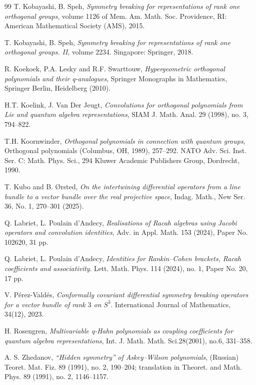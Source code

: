 \documentclass[a4paper,12pt]{article}
\numberwithin{equation}{section}
\theoremstyle{rem}
\theoremstyle{definition}
\begin{document}
\begin{thebibliography}{99}
 T. Kobayashi, B. Speh, \emph{Symmetry breaking for representations of rank one orthogonal groups}, volume 1126 of Mem. Am. Math. Soc. Providence, RI: American Mathematical Society (AMS), 2015.

 T. Kobayashi, B. Speh,\emph{ Symmetry breaking for representations of rank one orthogonal groups. II},
volume 2234. Singapore: Springer, 2018.

 R. Koekoek, P.A. Lesky and R.F. Swarttouw, \emph{Hypergeometric orthogonal polynomials and
their q-analogues}, Springer Monographs in Mathematics, Springer Berlin, Heidelberg (2010).

 H.T. Koelink, J. Van Der Jeugt, \emph{Convolutions for orthogonal polynomials from Lie and quantum algebra representations}, SIAM J. Math. Anal. 29 (1998), no. 3, 794--822.

 T.H. Koornwinder, \emph{Orthogonal polynomials in connection with quantum groups}, Orthogonal polynomials (Columbus, OH, 1989), 257--292. NATO Adv. Sci. Inst. Ser. C: Math. Phys. Sci., 294 Kluwer Academic Publishers Group, Dordrecht, 1990.

 T. Kubo and B. Ørsted, \emph{On the intertwining differential operators from a line bundle to a vector bundle over the real projective space}, Indag. Math., New Ser. 36, No. 1, 270--301 (2025). 


 Q. Labriet, L. Poulain d'Andecy, \emph{Realisations of Racah algebras using Jacobi operators and convolution identities}, Adv. in Appl. Math. 153 (2024), Paper No. 102620, 31 pp.

 Q. Labriet, L. Poulain d'Andecy, \emph{Identities for Rankin--Cohen brackets, Racah coefficients and associativity}. Lett. Math. Phys. 114 (2024), no. 1, Paper No. 20, 17 pp.

 V. Pérez-Valdés, \emph{Conformally covariant differential symmetry breaking operators for a vector bundle of
rank $3$ on $S^3$}. International Journal of Mathematics, 34(12), 2023.

 H. Rosengren, \emph{Multivariable q-Hahn polynomials as coupling coefficients for quantum algebra representations}, Int. J. Math. Math. Sci.28(2001), no.6, 331--358.

 A. S. Zhedanov, \emph{``Hidden symmetry'' of Askey--Wilson polynomials}, (Russian) Teoret. Mat. Fiz. 89 (1991), no. 2, 190–204; translation in Theoret. and Math. Phys. 89 (1991), no. 2, 1146--1157.


\end{thebibliography}
\end{document}
